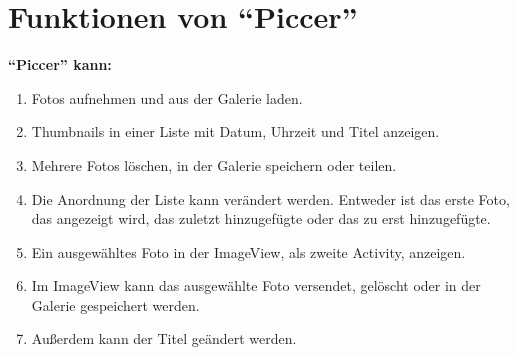 \section{Funktionen von \enquote{Piccer}}
\textbf{\enquote{Piccer} kann:}
\begin{enumerate}
\item Fotos aufnehmen und aus der Galerie laden.
\item Thumbnails in einer Liste mit Datum, Uhrzeit und Titel anzeigen. 
\item Mehrere Fotos löschen, in der Galerie speichern oder teilen.
\item Die Anordnung der Liste kann verändert werden. Entweder ist das erste Foto, das angezeigt wird, das zuletzt hinzugefügte oder das zu erst hinzugefügte.
\item Ein ausgewähltes Foto in der ImageView, als zweite Activity, anzeigen.
\item Im ImageView kann das ausgewählte Foto versendet, gelöscht oder in der Galerie gespeichert werden.
\item Außerdem kann der Titel geändert werden.

\end{enumerate}


